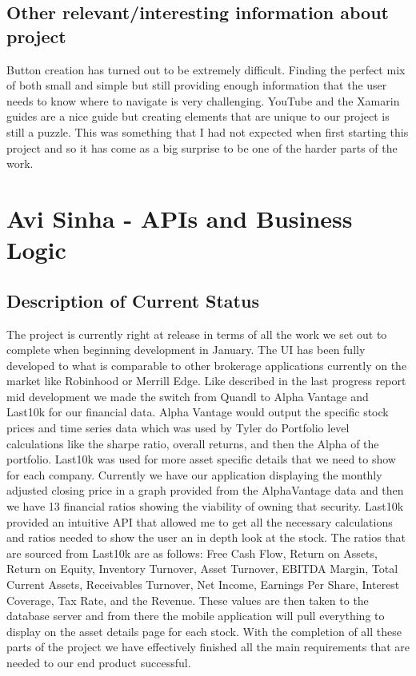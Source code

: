 \documentclass[letterpaper,10pt,titlepage,journal,compsoc,draftclsnofoot,onecolumn]{IEEEtran}
\begin{document}
\subsection{Other relevant/interesting information about project}

Button creation has turned out to be extremely difficult. Finding the perfect mix of both small and simple but still providing enough information that the user needs to know where to navigate is very challenging. YouTube and the Xamarin guides are a nice guide but creating elements that are unique to our project is still a puzzle. This was something that I had not expected when first starting this project and so it has come as a big surprise to be one of the harder parts of the work.

\section{Avi Sinha - APIs and Business Logic}

\subsection{Description of Current Status}

The project is currently right at release in terms of all the work we set out to complete when beginning development in January. The UI has been fully developed to what is comparable to other brokerage applications currently on the market like Robinhood or Merrill Edge. Like described in the last progress report mid development we made the switch from Quandl to Alpha Vantage and Last10k for our financial data. Alpha Vantage would output the specific stock prices and time series data which was used by Tyler do Portfolio level calculations like the sharpe ratio, overall returns, and then the Alpha of the portfolio. Last10k was used for more asset specific details that we need to show for each company. Currently we have our application displaying the monthly adjusted closing price in a graph provided from the AlphaVantage data and then we have 13 financial ratios showing the viability of owning that security. Last10k provided an intuitive API that allowed me to get all the necessary calculations and ratios needed to show the user an in depth look at the stock. The ratios that are sourced from Last10k are as follows: Free Cash Flow, Return on Assets, Return on Equity, Inventory Turnover, Asset Turnover, EBITDA Margin, Total Current Assets, Receivables Turnover, Net Income, Earnings Per Share, Interest Coverage, Tax Rate, and the Revenue. These values are then taken to the database server and from there the mobile application will pull everything to display on the asset details page for each stock. With the completion of all these parts of the project we have effectively finished all the main requirements that are needed to our end product successful. 
\end{document}
